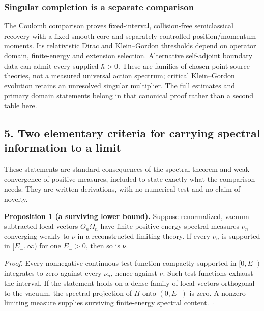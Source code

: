 \documentclass[11pt,a4paper]{article}
\begin{document}
\hypertarget{singular-completion-is-a-separate-comparison}{%
\subsubsection{Singular completion is a separate
comparison}\label{singular-completion-is-a-separate-comparison}}

The \href{self-sufficiency-contrast.md}{Coulomb comparison} proves
fixed-interval, collision-free semiclassical recovery with a fixed
smooth core and separately controlled position/momentum moments. Its
relativistic Dirac and Klein--Gordon thresholds depend on operator
domain, finite-energy and extension selection. Alternative self-adjoint
boundary data can admit every supplied \(\hbar>0\). These are families
of chosen point-source theories, not a measured universal action
spectrum; critical Klein--Gordon evolution retains an unresolved
singular multiplier. The full estimates and primary domain statements
belong in that canonical proof rather than a second table here.

\hypertarget{two-elementary-criteria-for-carrying-spectral-information-to-a-limit}{%
\subsection{5. Two elementary criteria for carrying spectral information
to a
limit}\label{two-elementary-criteria-for-carrying-spectral-information-to-a-limit}}

These statements are standard consequences of the spectral theorem and
weak convergence of positive measures, included to state exactly what
the comparison needs. They are written derivations, with no numerical
test and no claim of novelty.

\textbf{Proposition 1 (a surviving lower bound).} Suppose renormalized,
vacuum-subtracted local vectors \(O_n\Omega_n\) have finite positive
energy spectral measures \(\nu_n\) converging weakly to \(\nu\) in a
reconstructed limiting theory. If every \(\nu_n\) is supported in
\([E_-,\infty)\) for one \(E_->0\), then so is \(\nu\).

\emph{Proof.} Every nonnegative continuous test function compactly
supported in \([0,E_-)\) integrates to zero against every \(\nu_n\),
hence against \(\nu\). Such test functions exhaust the interval. If the
statement holds on a dense family of local vectors orthogonal to the
vacuum, the spectral projection of \(H\) onto \((0,E_-)\) is zero. A
nonzero limiting measure supplies surviving finite-energy spectral
content. \(\square\)
\end{document}
